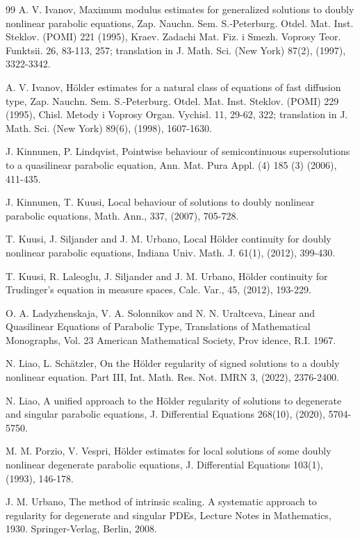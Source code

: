 \documentclass[a4paper,11pt,fullpage]{article}
\numberwithin{equation}{section}
\begin{document}
\begin{thebibliography}{99}
A. V. Ivanov, Maximum modulus estimates for generalized solutions to doubly nonlinear parabolic equations, Zap. Nauchn. Sem. S.-Peterburg. Otdel. Mat. Inst. Steklov. (POMI) 221 (1995), Kraev. Zadachi Mat.
 Fiz. i Smezh. Voprosy Teor. Funktsii. 26, 83-113, 257; translation in J. Math. Sci. (New York) 87(2), (1997),
  3322-3342.
 
A. V. Ivanov, H\"{o}lder estimates for a natural class of equations of fast diffusion type, Zap. Nauchn. Sem.
 S.-Peterburg. Otdel. Mat. Inst. Steklov. (POMI) 229 (1995), Chisl. Metody i Voprosy Organ. Vychisl. 11,
 29-62, 322; translation in J. Math. Sci. (New York) 89(6), (1998),  1607-1630.

J. Kinnunen, P. Lindqvist, Pointwise behaviour of semicontinuous supersolutions to a quasilinear 
parabolic equation, Ann. Mat. Pura Appl. (4) 185 (3) (2006), 411-435.

J. Kinnunen, T. Kuusi, Local behaviour of solutions to doubly nonlinear parabolic equations,
Math. Ann., 337, (2007), 705-728.

T. Kuusi, J. Siljander and J. M. Urbano, Local H\"{o}lder continuity for doubly nonlinear parabolic equations,
 Indiana Univ. Math. J. 61(1), (2012),  399-430.

T. Kuusi, R. Laleoglu, J. Siljander and J. M. Urbano, H\"{o}lder continuity for Trudinger's equation in measure spaces, Calc. Var., 45, (2012), 193-229. 

O. A. Ladyzhenskaja, V. A. Solonnikov and N. N. Uraltceva, Linear and Quasilinear Equations of
 Parabolic Type, Translations of Mathematical Monographs, Vol. 23 American Mathematical Society, Prov
idence, R.I. 1967. 


N. Liao, L. Sch\"{a}tzler, On the H\"{o}lder regularity of signed solutions to a doubly nonlinear equation. Part
 III, Int. Math. Res. Not. IMRN 3, (2022),  2376-2400. 

 N. Liao,  A unified approach to the H\"{o}lder regularity of solutions to degenerate and singular
 parabolic equations, J. Differential Equations 268(10),  (2020), 5704-5750. 

M. M. Porzio, V. Vespri, H\"{o}lder estimates for local solutions of some doubly nonlinear degenerate
 parabolic equations, J. Differential Equations 103(1),  (1993),  146-178. 

J. M. Urbano, The method of intrinsic scaling. A systematic approach to regularity for degenerate and
 singular PDEs, Lecture Notes in Mathematics, 1930. Springer-Verlag, Berlin, 2008.


\end{thebibliography}
\end{document}
